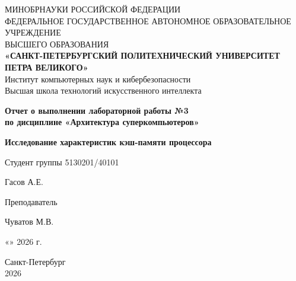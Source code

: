 \thispagestyle{empty}
\begin{center}
{\large
МИНОБРНАУКИ РОССИЙСКОЙ ФЕДЕРАЦИИ \\ФЕДЕРАЛЬНОЕ ГОСУДАРСТВЕННОЕ
АВТОНОМНОЕ ОБРАЗОВАТЕЛЬНОЕ УЧРЕЖДЕНИЕ \\ ВЫСШЕГО ОБРАЗОВАНИЯ \\ \vspace{7pt} \textbf{«САНКТ-ПЕТЕРБУРГСКИЙ ПОЛИТЕХНИЧЕСКИЙ УНИВЕРСИТЕТ ПЕТРА ВЕЛИКОГО»}\\ \vspace{7pt} Институт компьютерных наук и кибербезопасности\\ \vspace{4pt} Высшая школа технологий искусственного интеллекта

\vspace{100pt}
\textbf{Отчет о выполнении лабораторной работы №3}\\ \textbf{по дисциплине «Архитектура суперкомпьютеров»}
\par \vspace{8pt} \textbf{Исследование характеристик кэш-памяти процессора}
}
\end{center}

\vspace{70pt}
\noindent Студент группы 5130201/40101 \vspace{-25pt} \begin{flushright} \underline{\hspace{4cm}} Гасов А.Е. \;\;\;
\end{flushright} \par

\noindent Преподаватель\vspace{-25pt}\begin{flushright} \underline{\hspace{4cm}} Чуватов М.В. \end{flushright}

\vspace{70pt}
\begin{flushright}
    «\underline{\hspace{0.6cm}}» \underline{\hspace{2.5cm}} 2026 г.
\end{flushright}

\vspace{60pt}
\begin{center}
Санкт-Петербург \\ 2026
\end{center}

\newpage
